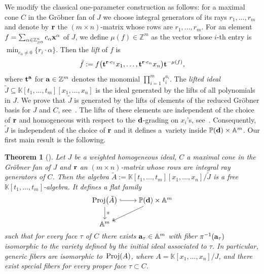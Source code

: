 \documentclass[pdftex]{sigma}%
\newtheorem{Theorem}{Theorem}[section]
\numberwithin{equation}{section}
\begin{document}
We modify the classical one-parameter construction as follows: for a maximal cone $C$ in the Gr\"obner fan of $J$ we choose integral generators of its rays $r_1,\dots,r_m$ and denote by ${\bf r}$ the $(m\times n)$-matrix whose rows are $r_1,\dots,r_m$.
For an element $f=\sum_{\alpha\in \mathbb Z_{\ge 0}^n} c_\alpha{\bf x}^\alpha$ of $J$,
we define $\mu(f)\in \mathbb Z^m$ as the vector whose $i$-th entry is $\min_{c_\alpha\not=0}\{r_i\cdot\alpha\}$.
Then the {\it lift} of $f$ is
\begin{displaymath}
 \tilde f:=f\big({\bf t}^{{\bf r}\cdot e_1}x_1,\dots, {\bf t}^{{\bf r}\cdot e_n}x_n\big) {\bf t}^{-\mu(f)},
\end{displaymath}
where ${\bf t}^{\bf a}$ for ${\bf a}\in \mathbb Z^m$ denotes the monomial $\prod_{i=1}^mt_i^{a_i}$.
The {\it lifted ideal} $\tilde J \subseteq \mathbb K[t_1,\dots,t_m][x_1,\dots,x_n]$ is the ideal generated by the lifts of all polynomials in $J$.
We prove that $\tilde J$ is generated by the lifts of elements of the reduced Gr\"obner basis for $J$ and $C$, see~.
The lifts of these elements are independent of the choice of ${\bf r}$ and homogeneous with respect to the ${\bf d}$-grading on $x_i$'s, see~.
Consequently, $\tilde J$ is independent of the choice of ${\bf r}$ and it defines a~variety inside $\mathbb P({\bf d})\times \mathbb A^m$. Our first main result is the following.

\begin{Theorem}[]
Let $J$ be a weighted homogeneous ideal, $C$ a maximal cone in the Gr\"obner fan of $J$ and ${\bf r}$ an $(m\times n)$-matrix whose rows are integral ray generators of $C$.
Then the algebra $\tilde A:=\mathbb K[t_1,\dots,t_m][x_1,\dots,x_n]/\tilde J$ is a free $\mathbb K[t_1,\dots,t_m]$-algebra.
It defines a flat family
 \begin{displaymath}
 \begin{tikzcd}[ampersand replacement=\&,cramped]
 {\rm Proj}\big(\tilde A\big) \ar[r,hook]\ar[d,"\pi"] \& \mathbb P({\bf d})\times \mathbb A^m \ar[ld,twoheadrightarrow]\\
 \mathbb A^m \&
 \end{tikzcd}
 \end{displaymath}
 such that for every face $\tau$ of $C$ there exists ${\bf a}_\tau\in \mathbb A^m$ with fiber
 $\pi^{-1}({\bf a}_\tau)$ isomorphic to the variety defined by the initial ideal associated to $\tau$.
 In particular, generic fibers are isomorphic to~${\rm Proj}(A)$, where $A= \mathbb{K}[x_1, \dots , x_n]/J$, and there exist special fibers for every proper face $\tau\subset C$.
\end{Theorem}
\end{document}
